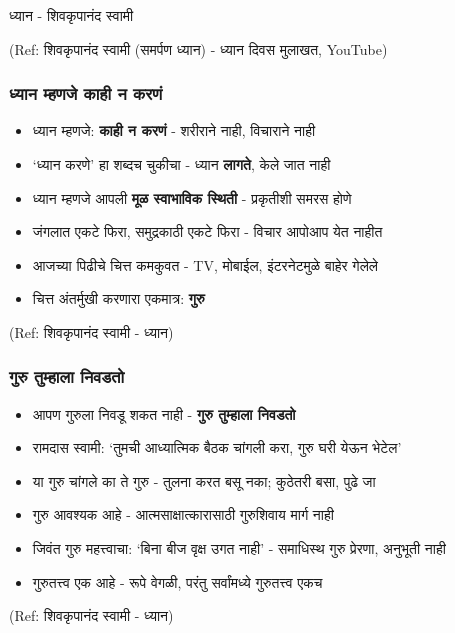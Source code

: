 \begin{frame}[fragile]\frametitle{}
\begin{center}
{\Large ध्यान - शिवकृपानंद स्वामी}
\end{center}

{\tiny (Ref: शिवकृपानंद स्वामी (समर्पण ध्यान) - ध्यान दिवस मुलाखत, YouTube)}

\end{frame}

\begin{frame}[fragile]\frametitle{ध्यान म्हणजे काही न करणं}

	\begin{itemize}
	\item ध्यान म्हणजे: \textbf{काही न करणं} - शरीराने नाही, विचाराने नाही
	\item `ध्यान करणे' हा शब्दच चुकीचा - ध्यान \textbf{लागते}, केले जात नाही
	\item ध्यान म्हणजे आपली \textbf{मूळ स्वाभाविक स्थिती} - प्रकृतीशी समरस होणे
	\item जंगलात एकटे फिरा, समुद्रकाठी एकटे फिरा - विचार आपोआप येत नाहीत
	\item आजच्या पिढीचे चित्त कमकुवत - TV, मोबाईल, इंटरनेटमुळे बाहेर गेलेले
	\item चित्त अंतर्मुखी करणारा एकमात्र: \textbf{गुरु}
	\end{itemize}

{\tiny (Ref: शिवकृपानंद स्वामी - ध्यान)}

\end{frame}

\begin{frame}[fragile]\frametitle{गुरु तुम्हाला निवडतो}

	\begin{itemize}
	\item आपण गुरुला निवडू शकत नाही - \textbf{गुरु तुम्हाला निवडतो}
	\item रामदास स्वामी: `तुमची आध्यात्मिक बैठक चांगली करा, गुरु घरी येऊन भेटेल'
	\item या गुरु चांगले का ते गुरु - तुलना करत बसू नका; कुठेतरी बसा, पुढे जा
	\item गुरु आवश्यक आहे - आत्मसाक्षात्कारासाठी गुरुशिवाय मार्ग नाही
	\item जिवंत गुरु महत्त्वाचा: `बिना बीज वृक्ष उगत नाही' - समाधिस्थ गुरु प्रेरणा, अनुभूती नाही
	\item गुरुतत्त्व एक आहे - रूपे वेगळी, परंतु सर्वांमध्ये गुरुतत्त्व एकच
	\end{itemize}

{\tiny (Ref: शिवकृपानंद स्वामी - ध्यान)}

\end{frame}

